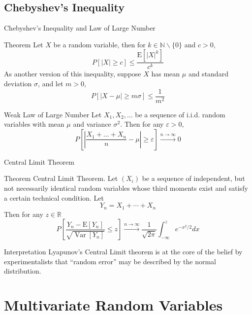 \documentclass{beamer}
\begin{document}
\subsection{Chebyshev's Inequality}
\begin{frame}{Chebyshev's Inequality and Law of Large Number}
\begin{block}{Theorem}
Let $X$ be a random variable, then for $k \in \mathbb{N} \backslash\{0\}$ and $c>0$,
$$
P[|X| \geq c] \leq \frac{\mathrm{E}\left[|X|^{k}\right]}{c^{k}}
$$
As another version of this inequality, suppose $X$ has mean $\mu$ and standard deviation $\sigma$, and let $m>0$,
$$
P[|X-\mu| \geq m \sigma] \leq \frac{1}{m^{2}}
$$
\end{block}
\begin{block}{Weak Law of Large Number}
Let $X_{1}, X_{2}, \ldots$ be a sequence of i.i.d. random variables with mean $\mu$ and variance $\sigma^{2}$. Then for any $\varepsilon>0$,
$$
P\left[\left|\frac{X_{1}+\ldots+X_{n}}{n}-\mu\right| \geq \varepsilon\right] \stackrel{n \rightarrow \infty}{\longrightarrow} 0
$$
\end{block}
\end{frame}

\begin{frame}{Central Limit Theorem}
\begin{block}{Theorem}
Central Limit Theorem. Let $\left(X_{i}\right)$ be a sequence of independent, but not necessarily identical random variables whose third moments exist and satisfy a certain technical condition. Let
$$
Y_{n}=X_{1}+\cdots+X_{n}
$$
Then for any $z \in \mathbb{R}$
$$
P\left[\frac{Y_{n}-\mathrm{E}\left[Y_{n}\right]}{\sqrt{\operatorname{Var}\left[Y_{n}\right]}} \leq z\right] \stackrel{n \rightarrow \infty}{\longrightarrow} \frac{1}{\sqrt{2 \pi}} \int_{-\infty}^{z} e^{-x^{2} / 2} d x
$$
\end{block}
\begin{block}{Interpretation}
Lyapunov’s Central Limit theorem is at the core of the belief by
experimentalists that “random error” may be described by the normal
distribution.
\end{block}
\end{frame}


\section{Multivariate Random Variables}
\end{document}
